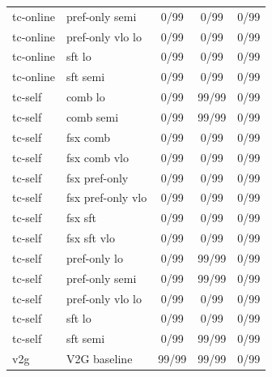 \documentclass[10pt,landscape]{article}
\begin{document}
\begin{tabular}{llccc}
tc-online & pref-only semi & \cellcolor{missing}0/99 & \cellcolor{missing}0/99 & \cellcolor{missing}0/99 \\
tc-online & pref-only vlo lo & \cellcolor{missing}0/99 & \cellcolor{missing}0/99 & \cellcolor{missing}0/99 \\
tc-online & sft lo & \cellcolor{missing}0/99 & \cellcolor{missing}0/99 & \cellcolor{missing}0/99 \\
tc-online & sft semi & \cellcolor{missing}0/99 & \cellcolor{missing}0/99 & \cellcolor{missing}0/99 \\
tc-self & comb lo & \cellcolor{missing}0/99 & \cellcolor{done}99/99 & \cellcolor{missing}0/99 \\
tc-self & comb semi & \cellcolor{missing}0/99 & \cellcolor{done}99/99 & \cellcolor{missing}0/99 \\
tc-self & fsx comb & \cellcolor{missing}0/99 & \cellcolor{missing}0/99 & \cellcolor{missing}0/99 \\
tc-self & fsx comb vlo & \cellcolor{missing}0/99 & \cellcolor{missing}0/99 & \cellcolor{missing}0/99 \\
tc-self & fsx pref-only & \cellcolor{missing}0/99 & \cellcolor{missing}0/99 & \cellcolor{missing}0/99 \\
tc-self & fsx pref-only vlo & \cellcolor{missing}0/99 & \cellcolor{missing}0/99 & \cellcolor{missing}0/99 \\
tc-self & fsx sft & \cellcolor{missing}0/99 & \cellcolor{missing}0/99 & \cellcolor{missing}0/99 \\
tc-self & fsx sft vlo & \cellcolor{missing}0/99 & \cellcolor{missing}0/99 & \cellcolor{missing}0/99 \\
tc-self & pref-only lo & \cellcolor{missing}0/99 & \cellcolor{done}99/99 & \cellcolor{missing}0/99 \\
tc-self & pref-only semi & \cellcolor{missing}0/99 & \cellcolor{done}99/99 & \cellcolor{missing}0/99 \\
tc-self & pref-only vlo lo & \cellcolor{missing}0/99 & \cellcolor{missing}0/99 & \cellcolor{missing}0/99 \\
tc-self & sft lo & \cellcolor{missing}0/99 & \cellcolor{missing}0/99 & \cellcolor{missing}0/99 \\
tc-self & sft semi & \cellcolor{missing}0/99 & \cellcolor{done}99/99 & \cellcolor{missing}0/99 \\
v2g & V2G baseline & \cellcolor{done}99/99 & \cellcolor{done}99/99 & \cellcolor{missing}0/99 \\
\bottomrule
\end{tabular}
\vspace{1em}
\end{document}
